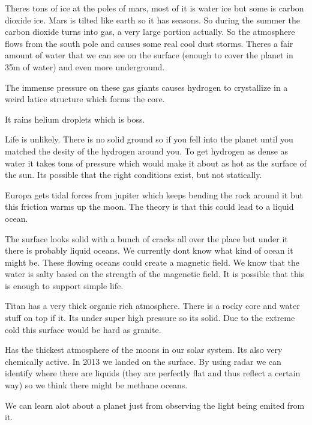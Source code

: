 \documentclass{article}
\begin{document}

Theres tons of ice at the poles of mars, most of it is water ice but some is carbon dioxide ice. Mars is tilted like earth so it has seasons. So during the summer the carbon dioxide turns into gas, a very large portion actually. So the atmosphere flows from the south pole and causes some real cool dust storms. Theres a fair amount of water that we can see on the surface (enough to cover the planet in 35m of water) and even more underground.


The immense pressure on these gas giants causes hydrogen to crystallize in a weird latice structure which forms the core.


It rains helium droplets which is boss.


Life is unlikely. There is no solid ground so if you fell into the planet until you matched the desity of the hydrogen around you. To get hydrogen as dense as water it takes tons of pressure which would make it about as hot as the surface of the sun. Its possible that the right conditions exist, but not statically.


Europa gets tidal forces from jupiter which keeps bending the rock around it but this friction warms up the moon. The theory is that this could lead to a liquid ocean.


The surface looks solid with a bunch of cracks all over the place but under it there is probably liquid oceans. We currently dont know what kind of ocean it might be. These flowing oceans could create a magnetic field. We know that the water is salty based on the strength of the magenetic field. It is possible that this is enough to support simple life.


Titan has a very thick organic rich atmosphere. There is a rocky core and water stuff on top if it. Its under super high pressure so its solid. Due to the extreme cold this surface would be hard as granite.


Has the thickest atmosphere of the moons in our solar system. Its also very chemically active. In 2013 we landed on the surface. By using radar we can identify where there are liquids (they are perfectly flat and thus reflect a certain way) so we think there might be methane oceans.


We can learn alot about a planet just from observing the light being emited from it.
\end{document}

